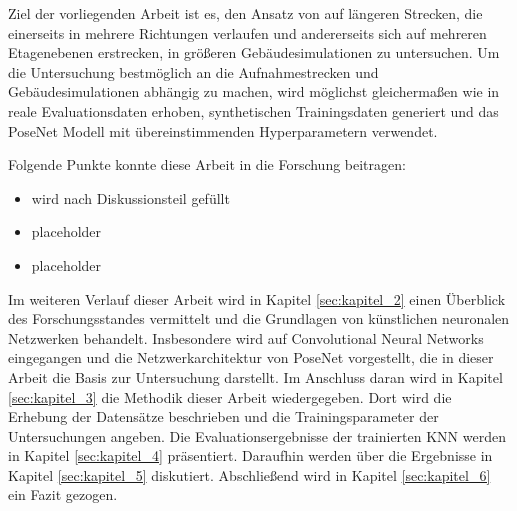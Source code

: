 Ziel der vorliegenden Arbeit ist es, den Ansatz von \citet{acharyaBIMPoseNetIndoorCamera2019} auf längeren Strecken, die einerseits in mehrere Richtungen verlaufen und andererseits sich auf mehreren Etagenebenen erstrecken, in größeren Gebäudesimulationen zu untersuchen. Um die Untersuchung bestmöglich an die Aufnahmestrecken und Gebäudesimulationen abhängig zu machen, wird möglichst gleichermaßen wie in \cite{acharyaBIMPoseNetIndoorCamera2019} reale Evaluationsdaten erhoben, synthetischen Trainingsdaten generiert und das PoseNet Modell mit übereinstimmenden Hyperparametern verwendet.

Folgende Punkte konnte diese Arbeit in die Forschung beitragen:
\begin{itemize}
	\item
	wird nach Diskussionsteil gefüllt
	\item
	placeholder
	\item
	placeholder
\end{itemize}

Im weiteren Verlauf dieser Arbeit wird in Kapitel \ref{sec:kapitel_2} einen Überblick des Forschungsstandes vermittelt und die Grundlagen von künstlichen neuronalen Netzwerken behandelt. Insbesondere wird auf Convolutional Neural Networks eingegangen und die Netzwerkarchitektur von PoseNet vorgestellt, die in dieser Arbeit die Basis zur Untersuchung darstellt. Im Anschluss daran wird in Kapitel \ref{sec:kapitel_3} die Methodik dieser Arbeit wiedergegeben. Dort wird die Erhebung der Datensätze beschrieben und die Trainingsparameter der Untersuchungen angeben. Die Evaluationsergebnisse der trainierten KNN werden in Kapitel \ref{sec:kapitel_4} präsentiert. Daraufhin werden über die Ergebnisse in Kapitel \ref{sec:kapitel_5} diskutiert. Abschließend wird in Kapitel \ref{sec:kapitel_6} ein Fazit gezogen. 


